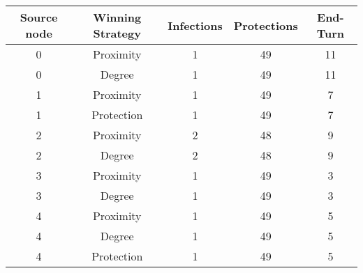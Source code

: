 \documentclass[results.tex]{subfiles}
\begin{document}
    \begin{center}
        \begin{tabular}{| c || c | c | c | c |}
            \hline
            {\bfseries Source node} & {\bfseries Winning Strategy} & {\bfseries Infections} & {\bfseries Protections}
            & {\bfseries End-Turn}
            \\  %
            \hline\hline
            0                       & Proximity                    & 1                      & 49                      & 11                   \\
            \hline
            0                       & Degree                       & 1                      & 49                      & 11                   \\
            \hline
            1                       & Proximity                    & 1                      & 49                      & 7                    \\
            \hline
            1                       & Protection                   & 1                      & 49                      & 7                    \\
            \hline
            2                       & Proximity                    & 2                      & 48                      & 9                    \\
            \hline
            2                       & Degree                       & 2                      & 48                      & 9                    \\
            \hline
            3                       & Proximity                    & 1                      & 49                      & 3                    \\
            \hline
            3                       & Degree                       & 1                      & 49                      & 3                    \\
            \hline
            4                       & Proximity                    & 1                      & 49                      & 5                    \\
            \hline
            4                       & Degree                       & 1                      & 49                      & 5                    \\
            \hline
            4                       & Protection                   & 1                      & 49                      & 5                    \\

\end{tabular}
\end{center}
\end{document}
